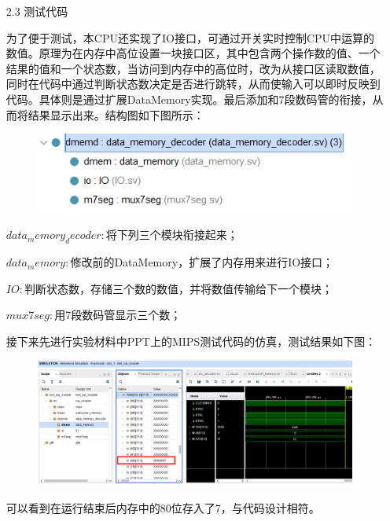 \documentclass[UTF8]{article}
\begin{document}
\begin{enumerate}
\begin{enumerate}
\begin{enumerate}
\begin{tabular}{|c|c|c|}
							\end{tabular}
					\end{enumerate}
			\end{enumerate}
		\item [2.3] 测试代码
			\par 为了便于测试，本CPU还实现了IO接口，可通过开关实时控制CPU中运算的数值。原理为在内存中高位设置一块接口区，其中包含两个操作数的值、一个结果的值和一个状态数，当访问到内存中的高位时，改为从接口区读取数值，同时在代码中通过判断状态数决定是否进行跳转，从而使输入可以即时反映到代码。具体则是通过扩展DataMemory实现。最后添加和7段数码管的衔接，从而将结果显示出来。结构图如下图所示：
			\begin{figure}[htbp]
				\centering
				\includegraphics[scale=1]{2-3.png}
			\end{figure}
			$data_memory_decoder:$将下列三个模块衔接起来；
			
			$data_memory:$修改前的DataMemory，扩展了内存用来进行IO接口；
			
			$IO:$判断状态数，存储三个数的数值，并将数值传输给下一个模块；
			
			$mux7seg:$用7段数码管显示三个数；
			
			\par 接下来先进行实验材料中PPT上的MIPS测试代码的仿真，测试结果如下图：
			\begin{figure}[htbp]
				\centering
				\includegraphics[scale=0.4]{2-3-1.png}
			\end{figure}
			\par 可以看到在运行结束后内存中的80位存入了7，与代码设计相符。
			

\end{enumerate}
\end{document}
